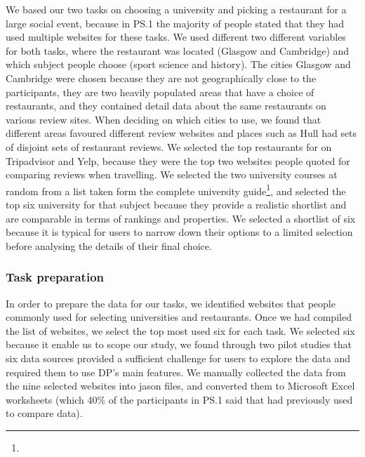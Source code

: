 \documentclass{sigchi}
\begin{document}
We based our two tasks on choosing a university and picking a restaurant for a large social event, because in PS.1 the majority of people stated that they had used multiple websites for these tasks.  We used different two different variables for both tasks, where the restaurant was located (Glasgow and Cambridge) and which subject people choose (sport science and history).  The cities Glasgow and Cambridge were chosen because they are not geographically close to the participants, they are two heavily populated areas that have a choice of restaurants, and they contained detail data about the same restaurants on various review sites.  When deciding on which cities to use, we found that different areas favoured different review websites and places such as Hull had sets of disjoint sets of restaurant reviews.  We selected the top restaurants for on Tripadvisor and Yelp, because they were the top two websites people quoted for comparing reviews when travelling.  We selected the two university courses at random from a list taken form the complete university guide\footnote{}, and selected the top six university for that subject because they provide a realistic shortlist and are comparable in terms of rankings and properties.   We selected a shortlist of six because it is typical for users to narrow down their options to a limited selection before analysing the details of their final choice.

\subsubsection{Task preparation}
In order to prepare the data for our tasks, we identified websites that people commonly used for selecting universities and restaurants.  Once we had compiled the list of websites, we select the top most used six for each task.  We selected six because it enable us to scope our study, we found through two pilot studies that six data sources provided a sufficient challenge for users to explore the data and required them to use DP's main features.  We manually collected the data from the nine selected websites into jason files, and converted them to Microsoft Excel worksheets (which 40\% of the participants in PS.1 said that had previously used to compare data).
\end{document}
